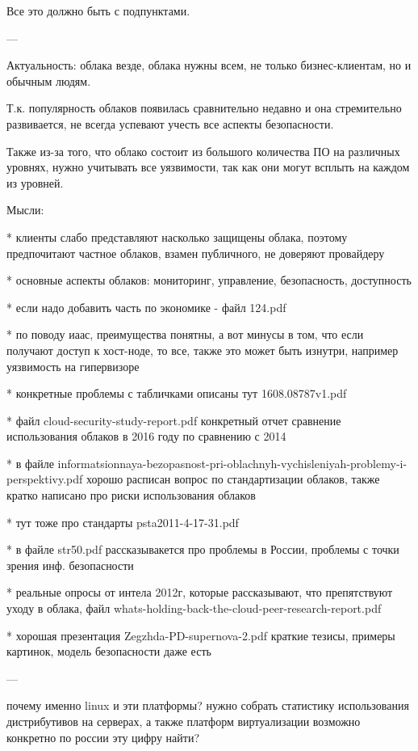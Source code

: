 Все это должно быть с подпунктами.


---

Актуальность: облака везде, облака нужны всем, не только бизнес-клиентам, но и обычным людям.

Т.к. популярность облаков появилась сравнительно недавно и она стремительно развивается, не всегда успевают учесть все аспекты безопасности.

Также из-за того, что облако состоит из большого количества ПО на различных уровнях, нужно учитывать все уязвимости, так как они могут всплыть на каждом из уровней.

Мысли:

* клиенты слабо представляют насколько защищены облака, поэтому предпочитают частное облаков, взамен публичного, не доверяют провайдеру

* основные аспекты облаков: мониторинг, управление, безопасность, доступность

* если надо добавить часть по экономике - файл 124.pdf

* по поводу иаас, преимущества понятны, а вот минусы в том, что если получают доступ к хост-ноде, то все, также это может быть изнутри, например уязвимость на гипервизоре

* конкретные проблемы с табличками описаны тут 1608.08787v1.pdf

* файл cloud-security-study-report.pdf конкретный отчет сравнение использования облаков в 2016 году по сравнению с 2014

* в файле informatsionnaya-bezopasnost-pri-oblachnyh-vychisleniyah-problemy-i-perspektivy.pdf хорошо расписан вопрос по стандартизации облаков, также кратко написано про риски использования облаков

* тут тоже про стандарты psta2011-4-17-31.pdf

* в файле str50.pdf рассказывакется про проблемы в России, проблемы с точки зрения инф. безопасности

* реальные опросы от интела 2012г, которые рассказывают, что препятствуют уходу в облака, файл whats-holding-back-the-cloud-peer-research-report.pdf

* хорошая презентация Zegzhda-PD-supernova-2.pdf краткие тезисы, примеры картинок, модель безопасности даже есть

---


почему именно linux и эти платформы?
нужно собрать статистику использования дистрибутивов на серверах, а также платформ виртуализации
возможно конкретно по россии эту цифру найти?

